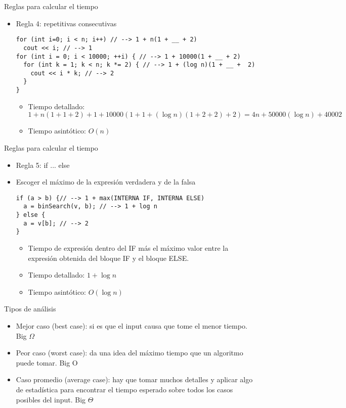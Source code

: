 \documentclass[aspectratio=169]{beamer}
\begin{document}
\begin{frame}[fragile]{Reglas para calcular el tiempo}
  \begin{itemize}
    \item Regla 4: repetitivas consecutivas
    \begin{lstlisting}
for (int i=0; i < n; i++) // --> 1 + n(1 + __ + 2)
  cout << i; // --> 1
for (int i = 0; i < 10000; ++i) { // --> 1 + 10000(1 + __ + 2)
  for (int k = 1; k < n; k *= 2) { // --> 1 + (log n)(1 + __ +  2)
    cout << i * k; // --> 2
  }
}
    \end{lstlisting}
    \begin{itemize}
      \item Tiempo detallado: $ 1 + n(1 + 1 + 2) + 1 + 10000(1 + 1 + (\log n)(1 + 2 + 2) + 2) = 4n + 50000(\log n) + 40002 $
      \item Tiempo asintótico: $ O(n) $
    \end{itemize}
  \end{itemize}
\end{frame}

\begin{frame}[fragile]{Reglas para calcular el tiempo}
  \begin{itemize}
    \item Regla 5:  if ... else
    \item Escoger el máximo de la expresión verdadera y de la falsa
    \begin{lstlisting}
if (a > b) {// --> 1 + max(INTERNA IF, INTERNA ELSE)
  a = binSearch(v, b); // --> 1 + log n
} else {
  a = v[b]; // --> 2
}
    \end{lstlisting}
    \begin{itemize}
      \item Tiempo de expresión dentro del IF más el máximo valor entre la expresión obtenida del bloque IF y el bloque ELSE.
      \item Tiempo detallado: $1 + \log n$
      \item Tiempo asintótico: $O(\log n)$
    \end{itemize}
  \end{itemize}
\end{frame}

\begin{frame}{Tipos de análisis}
  \begin{itemize}
    \item Mejor caso (best case): si es que el input causa que tome el menor tiempo. Big $ \Omega $
    \item Peor caso (worst case): da una idea del máximo tiempo que un algoritmo puede tomar. Big O
    \item Caso promedio (average case): hay que tomar muchos detalles y aplicar algo de estadística para encontrar el tiempo esperado sobre todos los casos posibles del input. Big $ \Theta $
  \end{itemize}
\end{frame}
\end{document}
